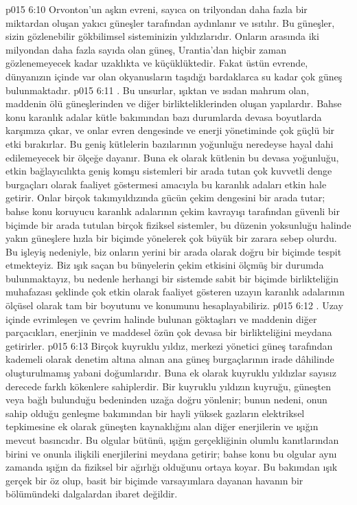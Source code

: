\vs p015 6:10 Orvonton’un aşkın evreni, sayıca on trilyondan daha fazla bir miktardan oluşan yakıcı güneşler tarafından aydınlanır ve ısıtılır. Bu güneşler, sizin gözlenebilir gökbilimsel sisteminizin yıldızlarıdır. Onların arasında iki milyondan daha fazla sayıda olan güneş, Urantia’dan hiçbir zaman gözlenemeyecek kadar uzaklıkta ve küçüklüktedir. Fakat üstün evrende, dünyanızın içinde var olan okyanusların taşıdığı bardaklarca su kadar çok güneş bulunmaktadır.
\vs p015 6:11 . Bu unsurlar, ışıktan ve ısıdan mahrum olan, maddenin ölü güneşlerinden ve diğer birlikteliklerinden oluşan yapılardır. Bahse konu karanlık adalar kütle bakımından bazı durumlarda devasa boyutlarda karşımıza çıkar, ve onlar evren dengesinde ve enerji yönetiminde çok güçlü bir etki bırakırlar. Bu geniş kütlelerin bazılarının yoğunluğu neredeyse hayal dahi edilemeyecek bir ölçeğe dayanır. Buna ek olarak kütlenin bu devasa yoğunluğu, etkin bağlayıcılıkta geniş komşu sistemleri bir arada tutan çok kuvvetli denge burgaçları olarak faaliyet göstermesi amacıyla bu karanlık adaları etkin hale getirir. Onlar birçok takımyıldızında gücün çekim dengesini bir arada tutar; bahse konu koruyucu karanlık adalarının çekim kavrayışı tarafından güvenli bir biçimde bir arada tutulan birçok fiziksel sistemler, bu düzenin yoksunluğu halinde yakın güneşlere hızla bir biçimde yönelerek çok büyük bir zarara sebep olurdu. Bu işleyiş nedeniyle, biz onların yerini bir arada olarak doğru bir biçimde tespit etmekteyiz. Biz ışık saçan bu bünyelerin çekim etkisini ölçmüş bir durumda bulunmaktayız, bu nedenle herhangi bir sistemde sabit bir biçimde birlikteliğin muhafazası şeklinde çok etkin olarak faaliyet gösteren uzayın karanlık adalarının ölçüsel olarak tam bir boyutunu ve konumunu hesaplayabiliriz.
\vs p015 6:12 . Uzay içinde evrimleşen ve çevrim halinde bulunan göktaşları ve maddenin diğer parçacıkları, enerjinin ve maddesel özün çok devasa bir birlikteliğini meydana getirirler.
\vs p015 6:13 Birçok kuyruklu yıldız, merkezi yönetici güneş tarafından kademeli olarak denetim altına alınan ana güneş burgaçlarının irade dâhilinde oluşturulmamış yabani doğumlarıdır. Buna ek olarak kuyruklu yıldızlar sayısız derecede farklı kökenlere sahiplerdir. Bir kuyruklu yıldızın kuyruğu, güneşten veya bağlı bulunduğu bedeninden uzağa doğru yönlenir; bunun nedeni, onun sahip olduğu genleşme bakımından bir hayli yüksek gazların elektriksel tepkimesine ek olarak güneşten kaynaklığını alan diğer enerjilerin ve ışığın mevcut basıncıdır. Bu olgular bütünü, ışığın gerçekliğinin olumlu kanıtlarından birini ve onunla ilişkili enerjilerini meydana getirir; bahse konu bu olgular aynı zamanda ışığın da fiziksel bir ağırlığı olduğunu ortaya koyar. Bu bakımdan ışık gerçek bir öz olup, basit bir biçimde varsayımlara dayanan havanın bir bölümündeki dalgalardan ibaret değildir.
